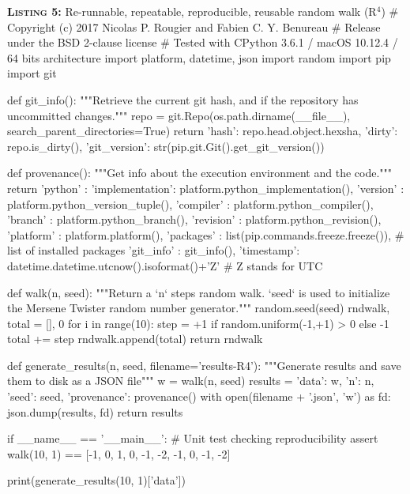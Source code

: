 \documentclass[a4paper,11pt]{article}
\begin{document}
\noindent \begin{minipage}[c]{\linewidth}
\begin{code}{\textbf{\textsc{Listing 5:}} Re-runnable, repeatable, reproducible, reusable random walk (R$^4$)}
# Copyright (c) 2017 Nicolas P. Rougier and Fabien C. Y. Benureau
# Release under the BSD 2-clause license
# Tested with CPython 3.6.1 / macOS 10.12.4 / 64 bits architecture
import platform, datetime, json
import random
import pip
import git

def git_info():
    """Retrieve the current git hash, and if the repository has uncommitted changes."""
    repo = git.Repo(os.path.dirname(__file__), search_parent_directories=True)
    return {'hash': repo.head.object.hexsha, 'dirty': repo.is_dirty(),
            'git_version': str(pip.git.Git().get_git_version())}

def provenance():
    """Get info about the execution environment and the code."""
    return {'python'   : {'implementation': platform.python_implementation(),
                          'version'       : platform.python_version_tuple(),
                          'compiler'      : platform.python_compiler(),
                          'branch'        : platform.python_branch(),
                          'revision'      : platform.python_revision()},
            'platform' : platform.platform(),
            'packages'  : list(pip.commands.freeze.freeze()), # list of installed packages
            'git_info' : git_info(),
            'timestamp': datetime.datetime.utcnow().isoformat()+'Z'}  # Z stands for UTC

def walk(n, seed):
    """Return a `n` steps random walk.
    `seed` is used to initialize the Mersene Twister random number generator."""
    random.seed(seed)
    rndwalk, total = [], 0
    for i in range(10):
        step = +1 if random.uniform(-1,+1) > 0 else -1
        total += step
        rndwalk.append(total)
    return rndwalk

def generate_results(n, seed, filename='results-R4'):
    """Generate results and save them to disk as a JSON file"""
    w = walk(n, seed)
    results = {'data': w, 'n': n, 'seed': seed, 'provenance': provenance()}
    with open(filename + '.json', 'w') as fd:
        json.dump(results, fd)
    return results

if __name__ == '__main__':
    # Unit test checking reproducibility
    assert walk(10, 1) == [-1, 0, 1, 0, -1, -2, -1, 0, -1, -2]

    print(generate_results(10, 1)['data'])
\end{code}
\end{minipage}\\
\end{document}
